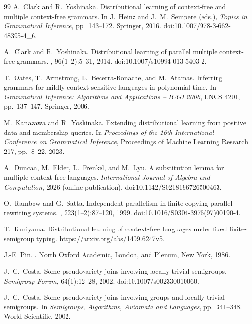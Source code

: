 \documentclass[11pt,a4paper]{ltjsarticle}
\numberwithin{equation}{section}
\theoremstyle{plain}
\theoremstyle{definition}
\theoremstyle{remark}
\begin{document}
\begin{thebibliography}{99}
A.~Clark and R.~Yoshinaka.
\newblock Distributional learning of context-free and multiple context-free grammars.
\newblock In J.~Heinz and J.~M.~Sempere (eds.), \emph{Topics in Grammatical
Inference}, pp.~143--172. Springer, 2016.
\newblock doi:10.1007/978-3-662-48395-4\_6.

A.~Clark and R.~Yoshinaka.
\newblock Distributional learning of parallel multiple context-free grammars.
, 96(1--2):5--31, 2014.
\newblock doi:10.1007/s10994-013-5403-2.

T.~Oates, T.~Armstrong, L.~Becerra-Bonache, and M.~Atamas.
\newblock Inferring grammars for mildly context-sensitive languages in polynomial-time.
\newblock In {\em Grammatical Inference: Algorithms and Applications -- ICGI 2006},
LNCS 4201, pp.~137--147. Springer, 2006.

M.~Kanazawa and R.~Yoshinaka.
\newblock Extending distributional learning from positive data and membership queries.
\newblock In {\em Proceedings of the 16th International Conference on Grammatical Inference},
Proceedings of Machine Learning Research 217, pp.~8--22, 2023.

A.~Duncan, M.~Elder, L.~Frenkel, and M.~Lyu.
\newblock A substitution lemma for multiple context-free languages.
\newblock \emph{International Journal of Algebra and Computation},
2026 (online publication).
\newblock doi:10.1142/S0218196726500463.

O.~Rambow and G.~Satta.
\newblock Independent parallelism in finite copying parallel rewriting systems.
, 223(1--2):87--120, 1999.
\newblock doi:10.1016/S0304-3975(97)00190-4.

T.~Kuriyama.
\newblock Distributional learning of context-free languages under fixed
finite-semigroup typing.
\newblock \url{https://arxiv.org/abs/1409.6247v5}.

J.-E. Pin.
.
\newblock North Oxford Academic, London, and Plenum, New York, 1986.

J.~C.~Costa.
\newblock Some pseudovariety joins involving locally trivial semigroups.
\newblock \emph{Semigroup Forum}, 64(1):12--28, 2002.
\newblock doi:10.1007/s002330010060.

J.~C.~Costa.
\newblock Some pseudovariety joins involving groups and locally trivial semigroups.
\newblock In \emph{Semigroups, Algorithms, Automata and Languages},
pp.~341--348. World Scientific, 2002.


\end{thebibliography}
\end{document}
